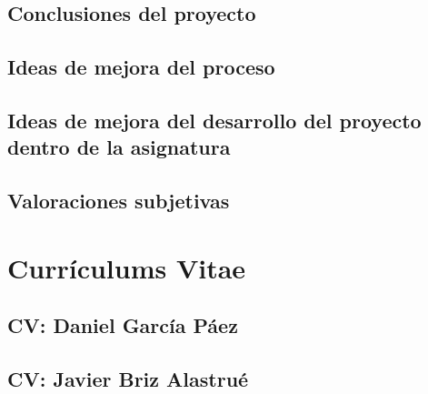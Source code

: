 \documentclass[10pt,spanish]{article}
\let\stdsection\section
\renewcommand\section{\newpage\stdsection}
\begin{document}
\subsection{Conclusiones del proyecto}


\subsection{Ideas de mejora del proceso}


\subsection{Ideas de mejora del desarrollo del proyecto dentro de la asignatura}


\subsection{Valoraciones subjetivas}


\appendix


\section{Currículums Vitae}\label{sec:cvs}


\subsection{CV: Daniel García Páez}

\newpage

\subsection{CV: Javier Briz Alastrué}

\newpage
\end{document}
